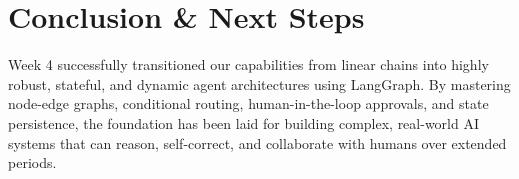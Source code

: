 \documentclass[12pt, a4paper]{article}
\begin{document}
\vspace{0.5cm}

\section{Conclusion \& Next Steps}
Week 4 successfully transitioned our capabilities from linear chains into highly robust, stateful, and dynamic agent architectures using LangGraph. By mastering node-edge graphs, conditional routing, human-in-the-loop approvals, and state persistence, the foundation has been laid for building complex, real-world AI systems that can reason, self-correct, and collaborate with humans over extended periods.
\end{document}
